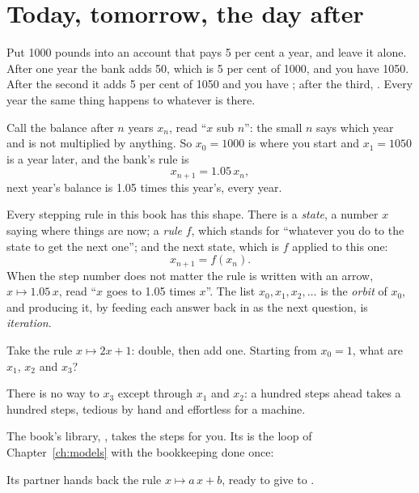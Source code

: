 \section{Today, tomorrow, the day after}
\label{sec:ch02-rule}

\noindent
Put 1000 pounds into an account that pays 5 per cent a year, and leave it
alone. After one year the bank adds 50, which is 5 per cent of 1000, and
you have 1050. After the second it adds 5 per cent of 1050 and you have
; after the third, . Every year the
same thing happens to whatever is there.

Call the balance after $n$ years $x_n$, read \enquote{$x$ sub $n$}: the
small $n$ says which year and is not multiplied by anything. So $x_0 = 1000$
is where you start and $x_1 = 1050$ is a year later, and the bank's rule is
\[ x_{n+1} = \num{1.05}\, x_n , \]
next year's balance is \num{1.05} times this year's, every year.

Every stepping rule in this book has this shape. There is a \emph{state}, a
number $x$ saying where things are now; a \emph{rule} $f$, which stands for
\enquote{whatever you do to the state to get the next one}; and the next
state, which is $f$ applied to this one:
\[ x_{n+1} = f(x_n) . \]
When the step number does not matter the rule is written with an arrow,
$x \mapsto \num{1.05}\,x$, read \enquote{$x$ goes to \num{1.05} times $x$}.
The list $x_0, x_1, x_2, \ldots$ is the \emph{orbit} of $x_0$, and
producing it, by feeding each answer back in as the next question, is
\emph{iteration}.


\begin{think}
Take the rule $x \mapsto 2x + 1$: double, then add one. Starting from
$x_0 = 1$, what are $x_1$, $x_2$ and $x_3$?
\end{think}
There is no way to $x_3$ except through $x_1$ and $x_2$: a hundred steps
ahead takes a hundred steps, tedious by hand and effortless for a
machine.

\begin{projectbox}[unbreakable]
The book's library, , takes the steps for you. Its
 is the loop of Chapter~\ref{ch:models} with the bookkeeping
done once:


\noindent
Its partner  hands back the rule $x \mapsto a\,x + b$,
ready to give to .
\end{projectbox}

